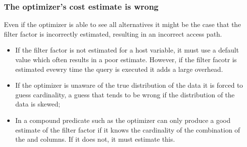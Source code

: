 \subsubsection{The optimizer's cost estimate is wrong}
Even if the optimizer is able to see all alternatives it might be the case that
the filter factor is incorrectly estimated, resulting in an incorrect access
path.

\begin{itemize}
\item If the filter factor is not estimated for a host variable, it must use a
  default value which often results in a poor estimate. However, if the filter
  facotr is estimated evewry time the query is executed it adds a large
  overhead.
\item If the optimizer is unaware of the true distribution of the data it is
  forced to guess cardinality, a guess that tends to be wrong if the
  distribution of the data is skewed;
\item In a compound predicate such as  the optimizer can only produce a good estimate of the filter factor
  if it knows the cardinality of the combination of the  and
   columns. If it does not, it must estimate this.
\end{itemize}
